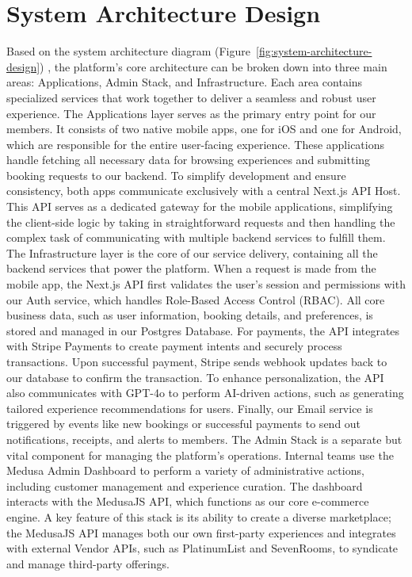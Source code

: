 \section{System Architecture Design}
Based on the system architecture diagram (Figure~\ref{fig:system-architecture-design}) , the platform's core architecture can be broken down into three main areas: Applications, Admin Stack, and Infrastructure. Each area contains specialized services that work together to deliver a seamless and robust user experience.
The Applications layer serves as the primary entry point for our members. It consists of two native mobile apps, one for iOS and one for Android, which are responsible for the entire user-facing experience. These applications handle fetching all necessary data for browsing experiences and submitting booking requests to our backend. To simplify development and ensure consistency, both apps communicate exclusively with a central Next.js API Host. This API serves as a dedicated gateway for the mobile applications, simplifying the client-side logic by taking in straightforward requests and then handling the complex task of communicating with multiple backend services to fulfill them.
The Infrastructure layer is the core of our service delivery, containing all the backend services that power the platform. When a request is made from the mobile app, the Next.js API first validates the user's session and permissions with our Auth service, which handles Role-Based Access Control (RBAC). All core business data, such as user information, booking details, and preferences, is stored and managed in our Postgres Database. For payments, the API integrates with Stripe Payments to create payment intents and securely process transactions. Upon successful payment, Stripe sends webhook updates back to our database to confirm the transaction. To enhance personalization, the API also communicates with GPT-4o to perform AI-driven actions, such as generating tailored experience recommendations for users. Finally, our Email service is triggered by events like new bookings or successful payments to send out notifications, receipts, and alerts to members.
The Admin Stack is a separate but vital component for managing the platform's operations. Internal teams use the Medusa Admin Dashboard to perform a variety of administrative actions, including customer management and experience curation. The dashboard interacts with the MedusaJS API, which functions as our core e-commerce engine. A key feature of this stack is its ability to create a diverse marketplace; the MedusaJS API manages both our own first-party experiences and integrates with external Vendor APIs, such as PlatinumList and SevenRooms, to syndicate and manage third-party offerings.
